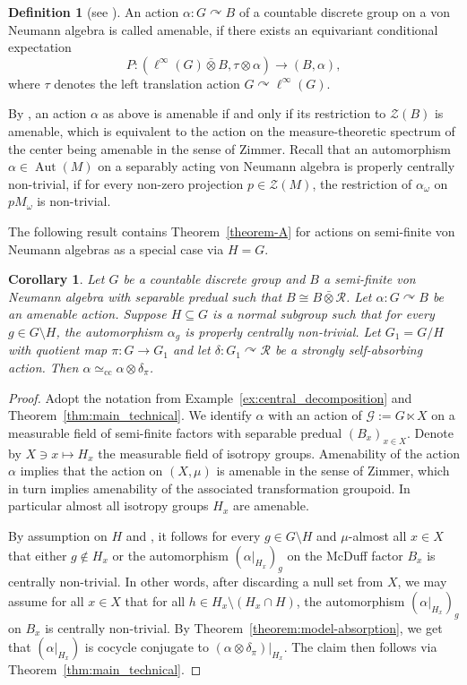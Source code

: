 \documentclass[11pt,a4paper]{article}
\newtheorem{corollary}[theorem]{Corollary}
\theoremstyle{definition}
\newtheorem{definition}[theorem]{Definition}
\theoremstyle{remark}
\numberwithin{equation}{section}
\numberwithin{theorem}{section}
\newcommand{\acts}{\curvearrowright}
\begin{document}
\begin{definition}[see {\cite[Definition~3.4]{Delaroche79}}]
An action $\alpha \colon G \acts B$ of a countable discrete group on a von Neumann algebra is called amenable, if there exists an equivariant conditional expectation 
\[
P\colon (\ell^\infty(G) \bar{\otimes} B, \tau \otimes \alpha) \rightarrow (B, \alpha),
\]
where $\tau$ denotes the left translation action $G \acts \ell^\infty(G)$.
\end{definition}

By \cite{Delaroche82}, an action $\alpha$ as above is amenable if and only if its restriction to $\mathcal{Z}(B)$ is amenable, which is equivalent to the action on the measure-theoretic spectrum of the center being amenable in the sense of Zimmer.
Recall that an automorphism $\alpha\in\operatorname{Aut}(M)$ on a separably acting von Neumann algebra is properly centrally non-trivial, if for every non-zero projection $p\in\mathcal{Z}(M)$, the restriction of $\alpha_\omega$ on $pM_\omega$ is non-trivial.

The following result contains Theorem~\ref{theorem-A} for actions on semi-finite von Neumann algebras as a special case via $H=G$.

\begin{corollary} \label{cor:McDuff-passes}
Let $G$ be a countable discrete group and $B$ a semi-finite von Neumann algebra with separable predual such that $B \cong B \bar{\otimes} \mathcal{R}$. 
Let $\alpha: G \acts B$ be an amenable action.
Suppose $H\subseteq G$ is a normal subgroup such that for every $g\in G\setminus H$, the automorphism $\alpha_g$ is properly centrally non-trivial.
Let $G_1=G/H$ with quotient map $\pi: G\to G_1$ and let $\delta: G_1\curvearrowright\mathcal R$ be a strongly self-absorbing action.
Then $\alpha \simeq_{\mathrm{cc}} \alpha \otimes \delta_\pi$.
\end{corollary}
\begin{proof}
Adopt the notation from Example~\ref{ex:central_decomposition} and Theorem~\ref{thm:main_technical}.
We identify $\alpha$ with an action of ${\mathcal{G}:= G \ltimes X}$ on a measurable field of semi-finite factors with separable predual $(B_x)_{x \in X}$. 
Denote by ${X \ni x \mapsto H_x}$ the measurable field of isotropy groups.
Amenability of the action $\alpha$ implies that the action on $(X,\mu)$ is amenable in the sense of Zimmer, 
which in turn implies amenability of the associated transformation groupoid. 
In particular almost all isotropy groups $H_x$ are amenable. 

By assumption on $H$ and \cite[Theorem 9.14]{MasudaTomatsu16}, it follows for every $g\in G\setminus H$ and $\mu$-almost all $x\in X$ that either $g\notin H_x$ or the automorphism $(\alpha|_{H_x})_g$ on the McDuff factor $B_x$ is centrally non-trivial.
In other words, after discarding a null set from $X$, we may assume for all $x\in X$ that for all $h\in H_x\setminus(H_x\cap H)$, the automorphism $(\alpha|_{H_x})_g$ on $B_x$ is centrally non-trivial.
By Theorem~\ref{theorem:model-absorption}, we get that $(\alpha|_{H_x})$ is cocycle conjugate to $(\alpha\otimes\delta_\pi)|_{H_x}$.
The claim then follows via Theorem~\ref{thm:main_technical}.
\end{proof}
\end{document}
